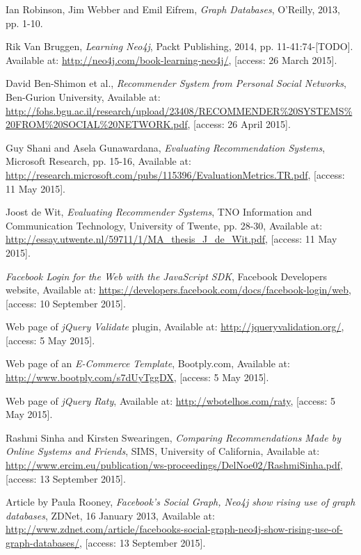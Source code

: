 \documentclass[12pt]{report}
\begin{document}
\begin{thebibliography}{99}
Ian Robinson, Jim Webber and Emil Eifrem, \textit{Graph Databases}, O'Reilly, 2013, pp. 1-10.

Rik Van Bruggen, \textit{Learning Neo4j}, Packt Publishing, 2014, pp. 11-41:74-[TODO]. Available at: \url{http://neo4j.com/book-learning-neo4j/}, [access: 26 March 2015].

David Ben-Shimon et al., \textit{Recommender System from Personal Social Networks}, Ben-Gurion University, Available at: \url{http://fohs.bgu.ac.il/research/upload/23408/RECOMMENDER%20SYSTEMS%20FROM%20SOCIAL%20NETWORK.pdf}, [access: 26 April 2015].

Guy Shani and Asela Gunawardana, \textit{Evaluating Recommendation Systems}, Microsoft Research, pp. 15-16, Available at: \url{http://research.microsoft.com/pubs/115396/EvaluationMetrics.TR.pdf}, [access: 11 May 2015].

Joost de Wit, \textit{Evaluating Recommender Systems}, TNO Information and Communication Technology, University of Twente, pp. 28-30, Available at: \url{http://essay.utwente.nl/59711/1/MA_thesis_J_de_Wit.pdf}, [access: 11 May 2015].

\textit{Facebook Login for the Web with the JavaScript SDK}, Facebook Developers website, Available at: \url{https://developers.facebook.com/docs/facebook-login/web}, [access: 10 September 2015].

Web page of \textit{jQuery Validate} plugin, Available at: \url{http://jqueryvalidation.org/}, [access: 5 May 2015].

Web page of an \textit{E-Commerce Template}, Bootply.com, Available at: \url{http://www.bootply.com/s7dUyTggDX}, [access: 5 May 2015].

Web page of \textit{jQuery Raty}, Available at: \url{http://wbotelhos.com/raty}, [access: 5 May 2015].

Rashmi Sinha and Kirsten Swearingen, \textit{Comparing Recommendations Made by Online Systems and Friends}, SIMS, University of California, Available at: \url{http://www.ercim.eu/publication/ws-proceedings/DelNoe02/RashmiSinha.pdf}, [access: 13 September 2015].

Article by Paula Rooney, \textit{Facebook's Social Graph, Neo4j show rising use of graph databases}, ZDNet, 16 January 2013, Available at: \url{http://www.zdnet.com/article/facebooks-social-graph-neo4j-show-rising-use-of-graph-databases/}, [access: 13 September 2015].

\end{thebibliography}

\listoffigures

\listoftables

\listoflistings
\end{document}

